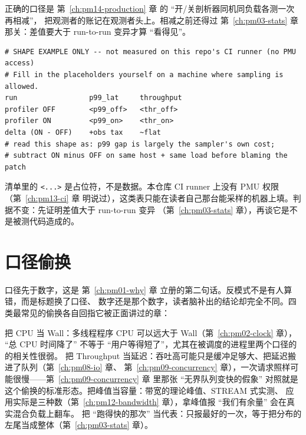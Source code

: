 \documentclass[12pt,a4paper,fontset=fandol]{ctexbook}
\newcommand{\Tp}[1]{\texttt{#1}}
\newcommand{\Lang}[1]{\textsf{#1}}
\newcommand{\MWall}{\Lang{Wall}}
\newcommand{\MCpu}{\Lang{CPU}}
\newcommand{\MThr}{\Lang{Throughput}}
\begin{document}
正确的口径是 第~\ref{ch:pm14-production} 章 的 ``开/关剖析器同机同负载各测一次再相减''，
把观测者的账记在观测者头上。相减之前还得过 第~\ref{ch:pm03-stats} 章 那关：差值要大于 run-to-run
变异才算 ``看得见''。

\begin{lstlisting}[style=outstyle, caption={形态示意（非本仓库实测值）：开/关剖析器对照的形状，重点在 p99 动而吞吐不动；尖括号是占位符}, label={lst:pm15-observer}]
# SHAPE EXAMPLE ONLY -- not measured on this repo's CI runner (no PMU access)
# Fill in the placeholders yourself on a machine where sampling is allowed.
run                 p99_lat     throughput
profiler OFF        <p99_off>   <thr_off>
profiler ON         <p99_on>    <thr_on>
delta (ON - OFF)    +obs tax    ~flat
# read this shape as: p99 gap is largely the sampler's own cost;
# subtract ON minus OFF on same host + same load before blaming the patch
\end{lstlisting}

清单里的 \Tp{<...>} 是占位符，不是数据。本仓库 CI runner 上没有 PMU 权限（第~\ref{ch:pm13-ci} 章
明说过），这类表只能在读者自己那台能采样的机器上填。判据不变：先证明差值大于 run-to-run 变异
（第~\ref{ch:pm03-stats} 章），再谈它是不是被测代码造成的。

\section{口径偷换}
\label{sec:pm15-antipattern-caliber}

口径先于数字，这是 第~\ref{ch:pm01-why} 章 立册的第二句话。反模式不是有人算错，而是标题换了口径、
数字还是那个数字，读者脑补出的结论却完全不同。四类最常见的偷换各自回指它被正面讲过的章：

把 \MCpu{} 当 \MWall{}：多线程程序 \MCpu{} 可以远大于 \MWall{}（第~\ref{ch:pm02-clock} 章），
``总 CPU 时间降了'' 不等于 ``用户等得短了''，尤其在被调度的进程里两个口径的的相关性很弱。
把 \MThr{} 当延迟：吞吐高可能只是缓冲足够大、把延迟搬进了队列（第~\ref{ch:pm08-io} 章、
第~\ref{ch:pm09-concurrency} 章），一次请求照样可能很慢——第~\ref{ch:pm09-concurrency} 章 里那张
``无界队列变快的假象'' 对照就是这个偷换的标准形态。把峰值当容量：带宽的理论峰值、STREAM 式实测、
应用实际是三种数（第~\ref{ch:pm12-bandwidth} 章），拿峰值报 ``我们有余量'' 会在真实混合负载上翻车。
把 ``跑得快的那次'' 当代表：只报最好的一次，等于把分布的左尾当成整体（第~\ref{ch:pm03-stats} 章）。
\end{document}
